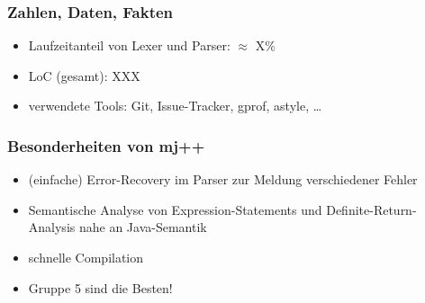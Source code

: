 \begin{frame}
	\frametitle{Zahlen, Daten, Fakten} %
	\begin{itemize}
		\item Laufzeitanteil von Lexer und Parser: $\approx$ X\%	%
		\item LoC (gesamt): XXX
		\item verwendete Tools: Git, Issue-Tracker, gprof, astyle, \dots
	\end{itemize}
\end{frame}

\begin{frame}
    \frametitle{Besonderheiten von mj++}
    \begin{itemize}
        \item (einfache) Error-Recovery im Parser zur Meldung verschiedener Fehler
        \item Semantische Analyse von Expression-Statements und Definite-Return-Analysis nahe an Java-Semantik
        \item schnelle Compilation
            \pause
        \item Gruppe 5 sind die Besten!
    \end{itemize}
\end{frame}